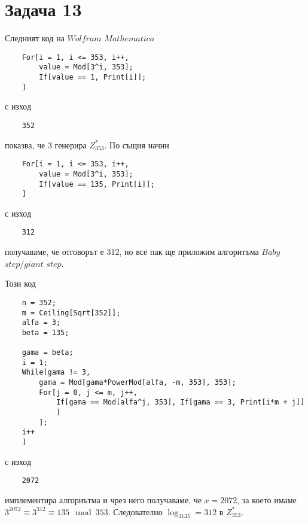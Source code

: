 \documentclass{article}
\begin{document}
\section*{Задача 13}

\justify
Следният код на $Wolfram$ $Mathematica$ 
\begin{verbatim}
    For[i = 1, i <= 353, i++,
        value = Mod[3^i, 353];
        If[value == 1, Print[i]];
    ]
\end{verbatim}
с изход 
\begin{verbatim}
    352
\end{verbatim}
показва, че 3 генерира $Z^*_{353}$. По същия начин 
\begin{verbatim}
    For[i = 1, i <= 353, i++,
        value = Mod[3^i, 353];
        If[value == 135, Print[i]];
    ]
\end{verbatim}
с изход 
\begin{verbatim}
    312
\end{verbatim}
получаваме, че отговорът е 312, но все пак ще приложим алгоритъма $Baby$ $step/giant$ $step$.

\justify
Този код 
\begin{verbatim}
    n = 352;
    m = Ceiling[Sqrt[352]];
    alfa = 3;
    beta = 135;

    gama = beta;
    i = 1;
    While[gama != 3, 
        gama = Mod[gama*PowerMod[alfa, -m, 353], 353];
        For[j = 0, j <= m, j++,
            If[gama == Mod[alfa^j, 353], If[gama == 3, Print[i*m + j]]
            ]
        ];
    i++
    ]
\end{verbatim}
с изход 
\begin{verbatim}
    2072
\end{verbatim}
имплементира алгориътма и чрез него получаваме, че $x = 2072$, за което имаме $3^{2072} \equiv 3^{312} \equiv 135 \mod 353$. Следователно $\log_3135 = 312$ в $Z^*_{353}$.
\end{document}

